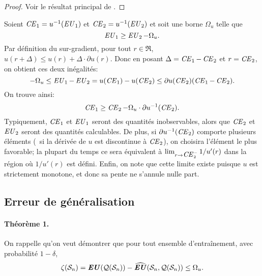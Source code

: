 \begin{proof}
  Voir le résultat principal de \cite{sridharan2009fast}.
\end{proof}


\begin{lemme}
  \label{lem:ce}
  Soient $\nCE_1 = u^{-1}(\nEU_1)$ et $\nCE_2 = u^{-1}(\nEU_2)$ et soit une borne $\Omega_u$ telle
  que
  \begin{equation}
    \nEU_1 \geq \nEU_2 - \Omega_u.
  \end{equation}
  Par définition du sur-gradient, pour tout $r \in \Re$,
  $u(r+\Delta) \leq u(r) + \Delta\cdot\partial u(r)$. Donc en posant
  $\Delta = \nCE_1 - \nCE_2$ et $r=\nCE_2$, on obtient ces deux inégalités:
  \begin{equation}
    -\Omega_u \leq \nEU_1 - \nEU_2 = u(\nCE_1) - u(\nCE_2) \leq \partial u(\nCE_2)(\nCE_1 - \nCE_2).
  \end{equation}
  On trouve ainsi:
  \begin{equation}
    \nCE_1 \geq \nCE_2 - \Omega_u\cdot \partial u^{-1}(\nCE_2).
  \end{equation}
  Typiquement, $\nCE_1$ et $\nEU_1$ seront des quantités inobservables, alors que $\nCE_2$
  et $\nEU_2$ seront des quantités calculables. De plus, si $\partial u^{-1}(\nCE_2)$ comporte
  plusieurs éléments (\eg\ si la dérivée de $u$ est discontinue à $\nCE_2$), on choisira
  l'élément le plus favorable; la plupart du temps ce sera équivalent à
  $\lim_{r\to\nCE_2^{-}}1/u'(r)$ dans la région où $1/u'(r)$ est défini. Enfin, on note que
  cette limite existe puisque $u$ est strictement monotone, et donc sa pente ne s'annule
  nulle part.
\end{lemme}


\subsection{Erreur de généralisation}

\paragraph{Théorème 1.} On rappelle qu'on veut démontrer que pour tout ensemble
d'entraînement, avec probabilité $1-\delta$, 
\begin{equation}
  \zeta(\S_n) = \EU(\alg(\S_n)) - \hEU(\S_n,\alg(\S_n)) \leq \Omega_u.
\end{equation}

